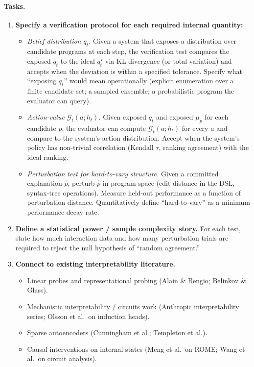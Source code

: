 \documentclass[11pt]{article}
\begin{document}
\paragraph{Tasks.}
\begin{enumerate}[leftmargin=*]
\item \textbf{Specify a verification protocol for each required internal quantity:}
\begin{itemize}[leftmargin=*]
\item \emph{Belief distribution $q_t$.} Given a system that exposes a distribution over candidate programs at each step, the verification test compares the exposed $q_t$ to the ideal $q_t^\star$ via KL divergence (or total variation) and accepts when the deviation is within a specified tolerance. Specify what ``exposing $q_t$'' would mean operationally (explicit enumeration over a finite candidate set; a sampled ensemble; a probabilistic program the evaluator can query).
\item \emph{Action-value $\mathcal{G}_t(a;h_t)$.} Given exposed $q_t$ and exposed $\mu_p$ for each candidate $p$, the evaluator can compute $\mathcal{G}_t(a;h_t)$ for every $a$ and compare to the system's action distribution. Accept when the system's policy has non-trivial correlation (Kendall $\tau$, ranking agreement) with the ideal ranking.
\item \emph{Perturbation test for hard-to-vary structure.} Given a committed explanation $\hat p$, perturb $\hat p$ in program space (edit distance in the DSL, syntax-tree operations). Measure held-out performance as a function of perturbation distance. Quantitatively define ``hard-to-vary'' as a minimum performance decay rate.
\end{itemize}
\item \textbf{Define a statistical power / sample complexity story.} For each test, state how much interaction data and how many perturbation trials are required to reject the null hypothesis of ``random agreement.''
\item \textbf{Connect to existing interpretability literature.}
\begin{itemize}[leftmargin=*]
\item Linear probes and representational probing (Alain \& Bengio; Belinkov \& Glass).
\item Mechanistic interpretability / circuits work (Anthropic interpretability series; Olsson et al.\ on induction heads).
\item Sparse autoencoders (Cunningham et al.; Templeton et al.).
\item Causal interventions on internal states (Meng et al.\ on ROME; Wang et al.\ on circuit analysis).

\end{itemize}
\end{enumerate}
\end{document}
